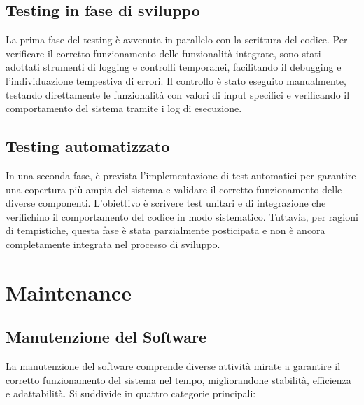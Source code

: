 \documentclass[a4paper,12pt]{article}
\begin{document}
\subsection{Testing in fase di sviluppo}
La prima fase del testing è avvenuta in parallelo con la scrittura del codice. Per verificare il corretto funzionamento delle funzionalità integrate, sono stati adottati strumenti di logging e controlli temporanei, facilitando il debugging e l’individuazione tempestiva di errori. Il controllo è stato eseguito manualmente, testando direttamente le funzionalità con valori di input specifici e verificando il comportamento del sistema tramite i log di esecuzione.

\subsection{Testing automatizzato}
In una seconda fase, è prevista l'implementazione di test automatici per garantire una copertura più ampia del sistema e validare il corretto funzionamento delle diverse componenti. L'obiettivo è scrivere test unitari e di integrazione che verifichino il comportamento del codice in modo sistematico. Tuttavia, per ragioni di tempistiche, questa fase è stata parzialmente posticipata e non è ancora completamente integrata nel processo di sviluppo.


\newpage
\section{Maintenance}
\subsection{Manutenzione del Software}

La manutenzione del software comprende diverse attività mirate a garantire il corretto funzionamento del sistema nel tempo, migliorandone stabilità, efficienza e adattabilità. Si suddivide in quattro categorie principali:
\end{document}
